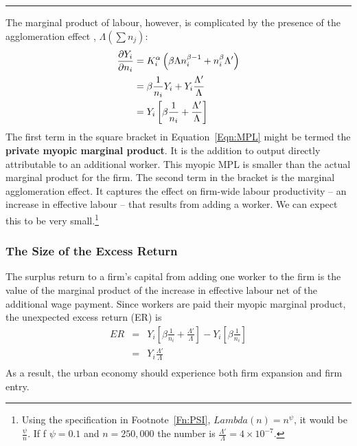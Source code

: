 \hrule 

The marginal product of labour, however,  is complicated by the presence of the  agglomeration effect , $\Lambda(\sum n_j)$:
\begin{eqnarray} \frac{\partial Y_i}{\partial n_i} &=   K_i^\alpha \left(  \beta\Lambda n_i^{\beta-1}  + n_i^{\beta}\Lambda'  \right)  \nonumber\\
&=   \beta\frac{1}{n_i} Y_i   +  Y_i \frac{\Lambda'}{\Lambda}  \nonumber\\
&=   Y_i  \left[  \beta\frac{1}{n_i}  + \frac{\Lambda' }{\Lambda} \right]   \label{Eqn:MPL}
\end{eqnarray}
The first term in the square bracket in Equation~\ref{Eqn:MPL} might be termed the \textbf{private myopic marginal product}. It is the addition to output directly attributable to an additional worker. This myopic MPL is smaller than the actual marginal product for the firm.  
The second term in the bracket   is the marginal agglomeration effect. It captures the effect on firm-wide labour productivity -- an increase in effective labour --   that results from adding a worker. We can expect this to be very small.\footnote{Using the specification in Footnote~\ref{Fn:PSI}, $Lambda(n)=n^\psi$, it would be $\frac{\psi}{n}$. If f $\psi=0.1$ and $n=250,000$ the number is $\frac{\Lambda' }{\Lambda} =4\times 10^{-7}$.}%

\subsubsection*{The Size of the Excess Return}
The surplus return to a firm's capital from adding one worker to the firm is the value of the marginal product of the increase in effective labour net of the additional wage payment.  Since workers are paid their myopic marginal product, the unexpected  excess return (ER) is 
\begin{eqnarray}
				ER	&=&   Y_i  \left[  \beta\frac{1}{n_i}  +  \frac{\Lambda' }{\Lambda} \right]   -Y_i  \left[  \beta\frac{1}{n_i} \right]\\
					&=&  Y_i   \frac{\Lambda' }{\Lambda}\\
\end{eqnarray}	
As a result, the urban economy should experience both firm expansion and firm entry. %

